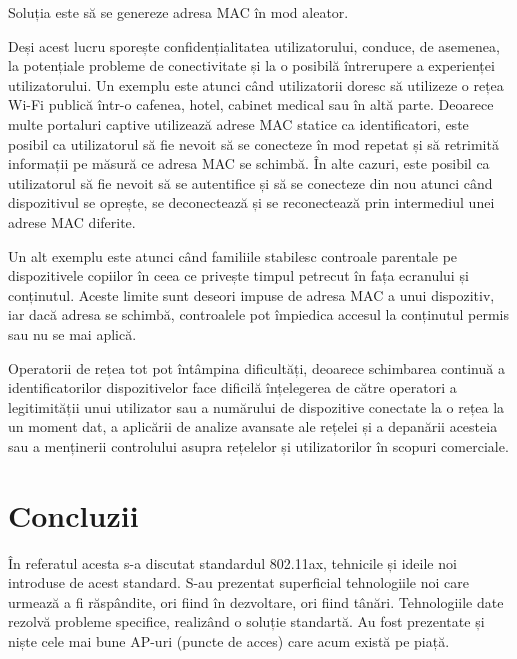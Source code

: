 \documentclass[a4paper,12pt]{report}
\def\oldchapter{} \let\oldchapter=\chapter{}
\def\chapter{\stepcounter{num_chapters}\oldchapter}
\begin{document}
Soluția este să se genereze adresa MAC în mod aleator.

Deși acest lucru sporește confidențialitatea utilizatorului, conduce, de asemenea, la potențiale probleme de conectivitate și la o posibilă întrerupere a experienței utilizatorului.
Un exemplu este atunci când utilizatorii doresc să utilizeze o rețea Wi-Fi publică într-o cafenea, hotel, cabinet medical sau în altă parte.
Deoarece multe portaluri captive utilizează adrese MAC statice ca identificatori, este posibil ca utilizatorul să fie nevoit să se conecteze în mod repetat și să retrimită informații pe măsură ce adresa MAC se schimbă.
În alte cazuri, este posibil ca utilizatorul să fie nevoit să se autentifice și să se conecteze din nou atunci când dispozitivul se oprește, se deconectează și se reconectează prin intermediul unei adrese MAC diferite.

Un alt exemplu este atunci când familiile stabilesc controale parentale pe dispozitivele copiilor în ceea ce privește timpul petrecut în fața ecranului și conținutul.
Aceste limite sunt deseori impuse de adresa MAC a unui dispozitiv, iar dacă adresa se schimbă, controalele pot împiedica accesul la conținutul permis sau nu se mai aplică.

Operatorii de rețea tot pot întâmpina dificultăți, deoarece schimbarea continuă a identificatorilor dispozitivelor face dificilă înțelegerea de către operatori a legitimității unui utilizator sau a numărului de dispozitive conectate la o rețea la un moment dat, a aplicării de analize avansate ale rețelei și a depanării acesteia sau a menținerii controlului asupra rețelelor și utilizatorilor în scopuri comerciale.


\chapter{Concluzii}

În referatul acesta s-a discutat standardul 802.11ax, tehnicile și ideile noi introduse de acest standard.
S-au prezentat superficial tehnologiile noi care urmează a fi răspândite, ori fiind în dezvoltare, ori fiind tânări.
Tehnologiile date rezolvă probleme specifice, realizând o soluție standartă.
Au fost prezentate și niște cele mai bune AP-uri (puncte de acces) care acum există pe piață.

\newpage
{}



\end{document}

